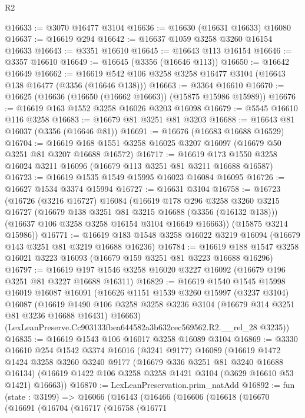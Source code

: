 \begin{lexlean}{R2}
\begin{coremodule}
@16633 := @3070 @16477 @3104
@16636 := @16630 (@16631 @16633) @16080
@16637 := @16619 @294
@16642 := @16637 @1059 @3258 @3260 @16154 @16633
@16643 := @3351 @16610
@16645 := @16643 @113 @16154
@16646 := @3357 @16610
@16649 := @16645 (@3356 (@16646 @113))
@16650 := @16642 @16649
@16662 := @16619 @542 @106 @3258 @3258 @16477 @3104 (@16643 @138 @16477 (@3356 (@16646 @138)))
@16663 := @3364 @16610
@16670 := @16625 (@16636 (@16650 (@16662 @16663)) (@15875 @15986 @15989))
@16676 := @16619 @163 @1552 @3258 @16026 @3203 @16098
@16679 := @5545 @16610 @116 @3258
@16683 := @16679 @81 @3251 @81 @3203
@16688 := @16643 @81 @16037 (@3356 (@16646 @81))
@16691 := @16676 (@16683 @16688 @16529)
@16704 := @16619 @168 @1551 @3258 @16025 @3207 @16097 (@16679 @50 @3251 @81 @3207 @16688 @16572)
@16717 := @16619 @173 @1550 @3258 @16024 @3211 @16096 (@16679 @113 @3251 @81 @3211 @16688 @16587)
@16723 := @16619 @1535 @1549 @15995 @16023 @16084 @16095
@16726 := @16627 @1534 @3374 @15994
@16727 := @16631 @3104
@16758 := @16723
    (@16726
      (@3216 @16727)
      @16084
      (@16619
        @178
        @296
        @3258
        @3260
        @3215
        @16727
        (@16679 @138 @3251 @81 @3215 @16688 (@3356 (@16132 @138)))
        (@16637 @106 @3258 @3258 @16154 @3104 @16649 @16663))
      (@15875 @3214 @15986))
@16771 := @16619 @183 @1548 @3258 @16022 @3219 @16094 (@16679 @143 @3251 @81 @3219 @16688 @16236)
@16784 := @16619 @188 @1547 @3258 @16021 @3223 @16093 (@16679 @159 @3251 @81 @3223 @16688 @16296)
@16797 := @16619 @197 @1546 @3258 @16020 @3227 @16092 (@16679 @196 @3251 @81 @3227 @16688 @16311)
@16829 := @16619
    @1540
    @1545
    @15998
    @16019
    @16087
    @16091
    (@16626
      @1151
      @1539
      @3260
      @15997
      (@3237 @3104)
      @16087
      (@16619 @1490 @106 @3258 @3258 @3236 @3104 (@16679 @314 @3251 @81 @3236 @16688 @16431) @16663)
      (LexLeanPreserve.Cc903133fbea644582a3b632cec569562.R2.__rel_28 @3235))
@16835 := @16619 @1543 @106 @16017 @3258 @16089 @3104
@16869 := @3330
    @16610
    @254
    @1542
    @3374
    @16016
    (@3241 @9177)
    @16089
    (@16619
      @1472
      @1424
      @3258
      @3260
      @3240
      @9177
      (@16679 @336 @3251 @81 @3240 @16688 @16134)
      (@16619 @1422 @106 @3258 @3258 @1421 @3104 (@3629 @16610 @53 @1421) @16663))
@16870 := LexLeanPreservation.prim_natAdd
@16892 := fun (state : @3199) =>
  @16066
    (@16143
      (@16466
        (@16606
          (@16618
            (@16670
              (@16691
                (@16704
                  (@16717
                    (@16758
                      (@16771

\end{coremodule}
\end{lexlean}
